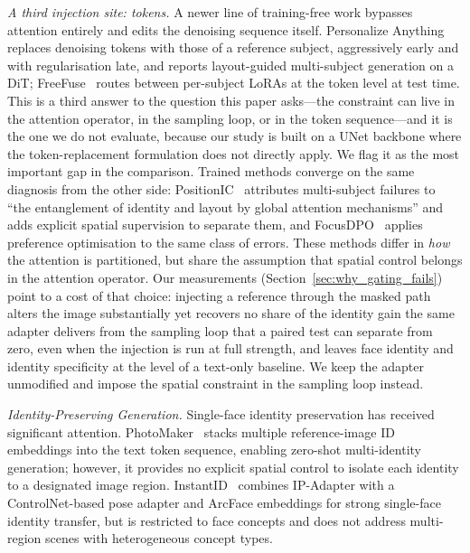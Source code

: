 \documentclass[review,10pt,times]{elsarticle}
\begin{document}
\noindent\textit{A third injection site: tokens.}
A newer line of training-free work bypasses attention entirely and edits
the denoising sequence itself.  Personalize
Anything~\cite{feng2026personalize} replaces denoising tokens with those
of a reference subject, aggressively early and with regularisation late,
and reports layout-guided multi-subject generation on a DiT;
FreeFuse~\cite{liu2025freefuse} routes between per-subject LoRAs at the
token level at test time.  This is a third answer to the question this
paper asks---the constraint can live in the attention operator, in the
sampling loop, or in the token sequence---and it is the one we do not
evaluate, because our study is built on a UNet backbone where the
token-replacement formulation does not directly apply.  We flag it as the
most important gap in the comparison.  Trained methods converge on the same
diagnosis from the other side:
PositionIC~\cite{hu2026positionic} attributes multi-subject failures to
``the entanglement of identity and layout by global attention
mechanisms'' and adds explicit spatial supervision to separate them, and
FocusDPO~\cite{jin2025focusdpo} applies preference optimisation to the
same class of errors.  These methods differ in \emph{how} the attention is
partitioned, but
share the assumption that spatial control belongs in the attention
operator.  Our measurements (Section~\ref{sec:why_gating_fails}) point to
a cost of that choice: injecting a reference through the masked path
alters the image substantially yet recovers no share of the identity gain
the same adapter delivers from the sampling loop that a paired test can
separate from zero, even when the injection is run at full strength, and
leaves face identity and identity specificity at the level of a text-only
baseline.  We keep the
adapter unmodified and impose the spatial constraint in the sampling loop
instead.

\noindent\textit{Identity-Preserving Generation.}
Single-face identity preservation has received significant attention.
PhotoMaker~\cite{li2024photomaker} stacks multiple reference-image ID
embeddings into the text token sequence, enabling zero-shot
multi-identity generation; however, it provides no explicit spatial
control to isolate each identity to a designated image region.
InstantID~\cite{wang2024instantid} combines IP-Adapter with a
ControlNet-based pose adapter and ArcFace embeddings for strong
single-face identity transfer, but is restricted to face concepts and
does not address multi-region scenes with heterogeneous concept types.
\end{document}
